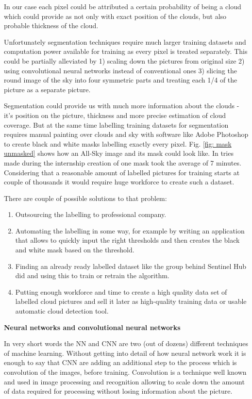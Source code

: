 \documentclass[]{book}
\begin{document}
		In our case each pixel could be attributed a certain probability of being a cloud which could provide as not only with exact position of the clouds, but also probable thickness of the cloud.
		
		Unfortunately segmentation techniques require much larger training datasets and computation power available for training as every pixel is treated separately. This could be partially alleviated by 1) scaling down the pictures from original size 2) using convolutional neural networks instead of conventional ones 3) slicing the round image of the sky into four symmetric parts and treating each 1/4 of the picture as a separate picture.
		
		Segmentation could provide us with much more information about the clouds - it's position on the picture, thickness and more precise estimation of cloud coverage. But at the same time labelling training datasets for segmentation requires manual painting over clouds and sky with software like Adobe Photoshop to create black  and white masks labelling exactly every pixel. Fig. \ref{fig: mask unmasked} shows how an All-Sky image and its mask could look like. In tries made during the internship creation of one mask took the average of 7 minutes. Considering that a reasonable amount of labelled pictures for training starts at couple of thousands it would require huge workforce to create such a dataset.
		
		There are couple of possible solutions to that problem:
		\begin{enumerate}
			\item Outsourcing the labelling to professional company.
			\item Automating the labelling in some way, for example by writing an application that allows to quickly input the right thresholds and then creates the black and white mask based on the threshold.
			\item Finding an already ready labelled dataset like the group behind Sentinel Hub did and using this to train or retrain the algorithm.
			\item Putting enough workforce and time to create a high quality data set of labelled cloud pictures and sell it later as high-quality training data or usable automatic cloud detection tool.
		\end{enumerate}
	
		\textbf{Neural networks and convolutional neural networks}
		
		In very short words the NN and CNN are two (out of dozens) different techniques of machine learning. Without getting into detail of how neural network work it is enough to say that CNN are adding an additional step to the process which is convolution of the images, before training. Convolution is a technique well known and used in image processing and recognition allowing to scale down the amount of data required for processing without losing information about the picture.
		
\end{document}
